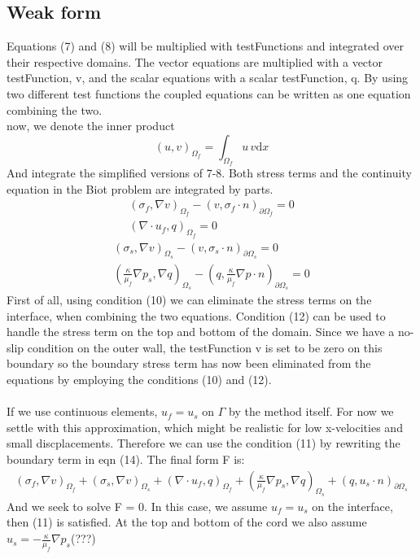 \subsection{Weak form}
Equations (7) and (8) will be multiplied with testFunctions and integrated over their respective domains. The vector equations are multiplied with a vector testFunction, v, and the scalar equations with a scalar testFunction, q. By using two different test functions the coupled equations can be written as one equation combining the two. 
\\
now, we denote the inner product
\[ (u,v)_{\Omega_f} = \int_{\Omega_f} u \, v \mathrm{d}x \]
And integrate the simplified versions of 7-8. Both stress terms and the continuity equation in the Biot problem are integrated by parts. 
\begin{align} (\sigma_f, \nabla v)_{\Omega_f} 
	- (v,\sigma_f \cdot n)_{\partial \Omega_f} 
	= 0 \nonumber \\
	(\nabla \cdot u_f, q)_{\Omega_f} = 0
\end{align}
\begin{align} 
	 (\sigma_s, \nabla v)_{\Omega_s} 
	- (v,\sigma_s \cdot n)_{\partial \Omega_s} 
	= 0 \nonumber \\
	(\frac{\kappa}{\mu_f} \nabla p_s, \nabla q)_{\Omega_s}
	- (q,\frac{\kappa}{\mu_f}\nabla p \cdot n) _{\partial \Omega_s}
	= 0
\end{align}
First of all, using condition (10) we can eliminate the stress terms on the interface, when combining the two equations. Condition (12) can be used to handle the stress term on the top and bottom of the domain. Since we have a no-slip condition on the outer wall, the testFunction v is set to be zero on this boundary so the boundary stress term has now been eliminated from the equations by employing the conditions (10) and (12). 
\\
\\
If we use continuous elements, $u_f = u_s$ on $\Gamma$ by the method itself. For now we settle with this approximation, which might be realistic for low x-velocities and small discplacements. Therefore we can use the condition (11) by rewriting the boundary term in eqn (14). The final form F is:
\begin{align}
	 (\sigma_f, \nabla v)_{\Omega_f} 
	+ (\sigma_s, \nabla v)_{\Omega_s}
	+ (\nabla \cdot u_f, q)_{\Omega_f}
	+ (\frac{\kappa}{\mu_f} \nabla p_s, \nabla q)_{\Omega_s}
	+ (q, u_s \cdot n)_{\partial \Omega_s}
\end{align}
And we seek to solve F = 0. In this case, we assume $u_f = u_s$ on the interface, then (11) is satisfied. At the top and bottom of the cord we also assume $u_s = -\frac{\kappa}{\mu_f}\nabla p_s$(???) 
	
